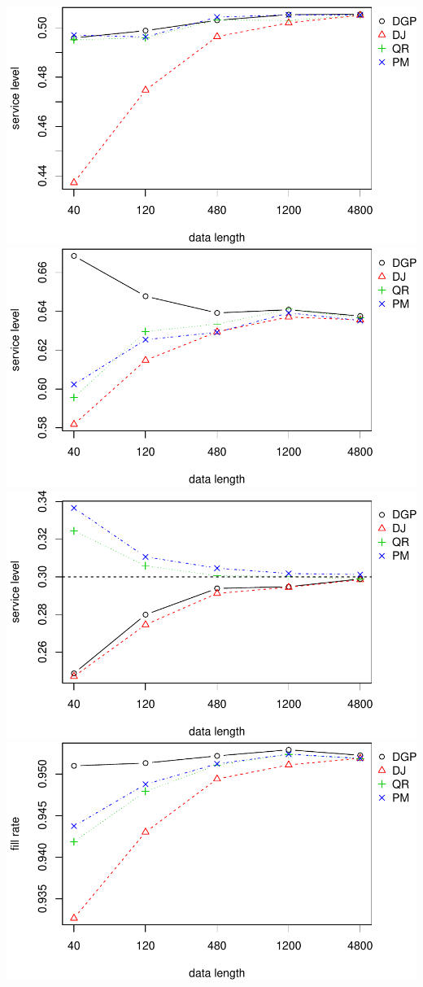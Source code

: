\documentclass[
]{article}
\begin{document}
\includegraphics{linear-norm-plot_files/figure-latex/sl-1.pdf}
\includegraphics{linear-norm-plot_files/figure-latex/sl-2.pdf}
\includegraphics{linear-norm-plot_files/figure-latex/sl-3.pdf}
\includegraphics{linear-norm-plot_files/figure-latex/fr-1.pdf}
\end{document}
